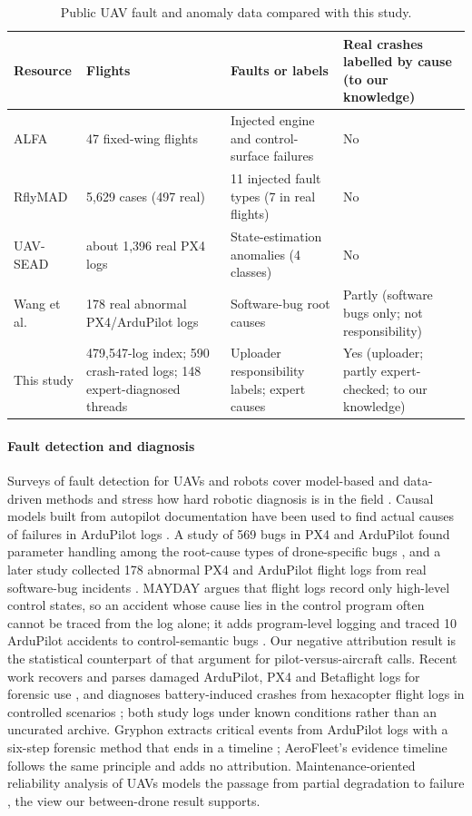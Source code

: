 \documentclass[preprint,12pt]{elsarticle}
\begin{document}
\begin{table}[t]
\centering
\caption{Public UAV fault and anomaly data compared with this study.}
\label{tab:datasets}
\small
\begin{tabularx}{\textwidth}{@{}lYYY@{}}
\toprule
Resource & Flights & Faults or labels & Real crashes labelled by cause (to our knowledge) \\
\midrule
ALFA \cite{keipour2021alfa} & 47 fixed-wing flights & Injected engine and control-surface failures & No \\
RflyMAD \cite{le2025rflymad} & 5,629 cases (497 real) & 11 injected fault types (7 in real flights) & No \\
UAV-SEAD \cite{kabaoglu2026uavsead} & about 1,396 real PX4 logs & State-estimation anomalies (4 classes) & No \\
Wang et al.\ \cite{wang2024loganomaly} & 178 real abnormal PX4/ArduPilot logs & Software-bug root causes & Partly (software bugs only; not responsibility) \\
This study & 479,547-log index; 590 crash-rated logs; 148 expert-diagnosed threads & Uploader responsibility labels; expert causes & Yes (uploader; partly expert-checked; to our knowledge) \\
\bottomrule
\end{tabularx}
\end{table}

\paragraph{Fault detection and diagnosis} Surveys of fault detection for UAVs and robots cover model-based and
data-driven methods and stress how hard robotic diagnosis is in the field \cite{puchalski2022uav,khalastchi2018fdd}.
Causal models built from autopilot documentation have been used to find actual causes of failures in ArduPilot logs
\cite{zibaei2024causal}. A study of 569 bugs in PX4 and ArduPilot found parameter handling among the root-cause types
of drone-specific bugs \cite{wang2021autopilot}, and a later study collected 178 abnormal PX4 and ArduPilot flight logs from real software-bug incidents \cite{wang2024loganomaly}. MAYDAY argues that flight logs record only high-level control states, so an accident whose cause lies in the control program often cannot be traced from the log alone; it adds program-level logging and traced 10 ArduPilot accidents to control-semantic bugs \cite{kim2020mayday}. Our negative attribution result is the statistical counterpart of that argument for pilot-versus-aircraft calls. Recent work recovers and parses damaged ArduPilot, PX4 and Betaflight logs for forensic use \cite{seong2026flightlog}, and diagnoses battery-induced crashes from hexacopter flight logs in controlled scenarios \cite{hakani2025battery}; both study logs under known conditions rather than an uncurated archive. Gryphon extracts critical events from ArduPilot logs with a six-step forensic method that ends in a timeline \cite{mantas2019gryphon}; AeroFleet's evidence timeline follows the same principle and adds no attribution. Maintenance-oriented reliability analysis of UAVs models the passage
from partial degradation to failure \cite{petritoli2018reliability}, the view our between-drone result supports.
\end{document}
